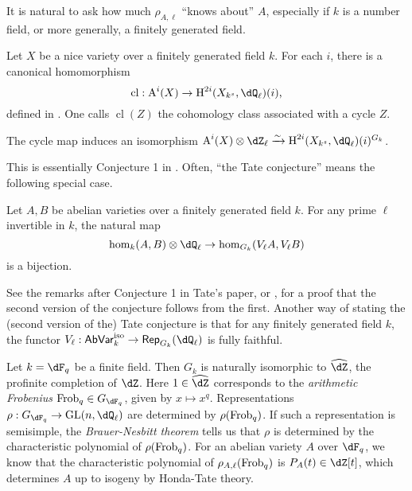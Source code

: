 It is natural to ask how much $\rho_{A,\ell}$ ``knows about'' $A$, especially 
if $k$ is a number field, or more generally, a finitely generated field. 

Let $X$ be a nice variety over a finitely generated field $k$. For each $i$, 
there is a canonical homomorphism 
\[
  \operatorname{cl}:\chow^i(X) \to \h^{2 i}(X_{k^s},\dQ_\ell)(i)\text{,}
\]
defined in \cite[VI 2.2.10]{de77}. One calls $\operatorname{cl}(Z)$ the 
cohomology class associated with a cycle $Z$. 

\begin{conjecture}[Tate]
The cycle map induces an isomorphism 
$\chow^i(X)\otimes\dZ_\ell \xrightarrow\sim \h^{2 i}(X_{k^s},\dQ_\ell)(i)^{G_k}$. 
\end{conjecture}

This is essentially Conjecture 1 in \cite{ta65}. Often, ``the Tate conjecture'' 
means the following special case. 

\begin{conjecture}[Tate]
Let $A,B$ be abelian varieties over a finitely generated field $k$. For any 
prime $\ell$ invertible in $k$, the natural map 
\[
  \hom_k(A,B)\otimes\dQ_\ell \to \hom_{G_k}(V_\ell A, V_\ell B) 
\]
is a bijection. 
\end{conjecture}

See the remarks after Conjecture 1 in Tate's paper, or 
\cite[IV.1.4]{fa84}, for a proof that the second version of the conjecture 
follows from the first. Another way of stating the (second version 
of the) Tate conjecture is that for any finitely generated field $k$, the 
functor $V_\ell:\mathsf{AbVar}_k^\text{iso} \to \mathsf{Rep}_{G_k}(\dQ_\ell)$ 
is fully faithful. 

\begin{example}
Let $k=\dF_q$ be a finite field. Then $G_k$ is naturally isomorphic to 
$\widehat\dZ$, the profinite completion of $\dZ$. Here $1\in \widehat\dZ$ 
corresponds to the \emph{arithmetic Frobenius} $\frob_q\in G_{\dF_q}$, given by 
$x\mapsto x^q$. Representations 
$\rho:G_{\dF_q} \to \gl{n}{\dQ_\ell}$ are determined by 
$\rho(\mathrm{Frob}_q)$. If such a representation is semisimple, the 
\emph{Brauer-Nesbitt theorem} tells us that $\rho$ is determined by the 
characteristic polynomial of $\rho(\mathrm{Frob}_q)$. For an abelian variety $A$ over 
$\dF_q$, we know that the characteristic polynomial of 
$\rho_{A,\ell}(\mathrm{Frob}_q)$ is $P_A(t)\in \dZ[t]$, which determines $A$ up to 
isogeny by Honda-Tate theory. 
\end{example}

